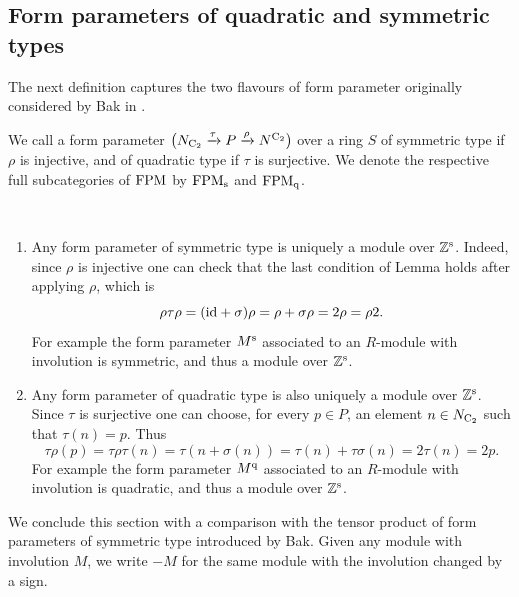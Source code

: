  
 
 
\subsection{Form parameters of quadratic and symmetric types}

The next definition captures the two flavours of form parameter originally considered by Bak in \cite{bak-form-parameter}.
 
 \begin{definition}
We call a form parameter $\big(N_{\mathrm{C_2}}\xrightarrow{\tau}P\xrightarrow{\rho}N^{\mathrm{C_2}}\big)$ over a ring $S$ of symmetric type if $\rho$ is injective, and of quadratic type if $\tau$ is surjective. We denote the respective full subcategories of $\mathrm {FPM}$ by $\mathrm {FPM}_{\mathrm{s}}$ and $\mathrm {FPM}_{\mathrm{q}}$.
 \end{definition}
 
  
\begin{example}\
\begin{enumerate}
\item
Any form parameter of symmetric type is uniquely a module over $\mathbb{Z}^{\mathrm{s}}$. Indeed, since $\rho$ is injective one can check that the last condition of Lemma  holds after applying $\rho$, which is
\[
\rho\tau\rho=(\mathrm{id}+\sigma)\rho=\rho+\sigma\rho=2\rho=\rho 2.
\]
For example the form parameter $M^{\mathrm{s}}$ associated to an $R$-module with involution is symmetric, and thus a module over $\mathbb{Z}^{\mathrm{s}}$.
\item
Any form parameter of quadratic type is also uniquely a module over $\mathbb{Z}^{\mathrm{s}}$. Since $\tau$ is surjective one can choose, for every $p\in P$, an element $n\in N_{\mathrm{C_2}}$ such that $\tau(n)=p$. Thus
\[
\tau\rho(p)=\tau\rho\tau(n)=\tau(n+\sigma(n))=\tau(n)+\tau\sigma(n)=2\tau(n)=2p.
\]
For example the form parameter $M^{\mathrm{q}}$ associated to an $R$-module with involution is quadratic, and thus a module over $\mathbb{Z}^{\mathrm{s}}$. 
\end{enumerate}
\end{example}


We conclude this section with a comparison with the tensor product of form parameters of symmetric type introduced by Bak. Given any module with involution $M$, we write $-M$ for the same module with the involution changed by a sign.


